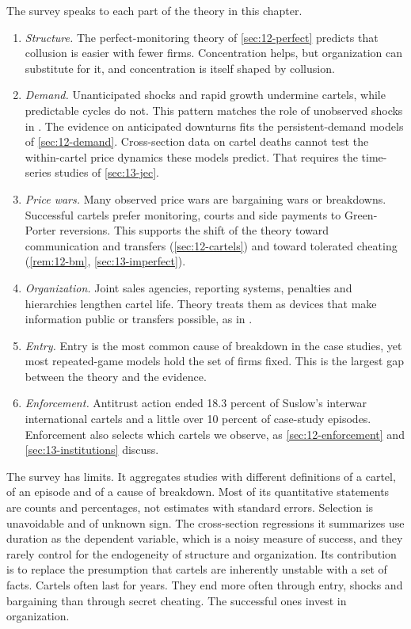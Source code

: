 The survey speaks to each part of the theory in this chapter.
\begin{enumerate}[label=(\arabic*)]
\item \emph{Structure.} The perfect-monitoring theory of \cref{sec:12-perfect} predicts that collusion is easier with
fewer firms. Concentration helps, but organization can substitute for it, and concentration is itself shaped by
collusion.
\item \emph{Demand.} Unanticipated shocks and rapid growth undermine cartels, while predictable cycles do not. This
pattern matches the role of unobserved shocks in \citet{GreenPorter1984}. The evidence on anticipated downturns fits
the persistent-demand models of \cref{sec:12-demand}. Cross-section data on cartel deaths cannot test the
within-cartel price dynamics these models predict. That requires the time-series studies of \cref{sec:13-jec}.
\item \emph{Price wars.} Many observed price wars are bargaining wars or breakdowns. Successful cartels prefer
monitoring, courts and side payments to Green-Porter reversions. This supports the shift of the theory toward
communication and transfers (\cref{sec:12-cartels}) and toward tolerated cheating (\cref{rem:12-bm},
\cref{sec:13-imperfect}).
\item \emph{Organization.} Joint sales agencies, reporting systems, penalties and hierarchies lengthen cartel life.
Theory treats them as devices that make information public or transfers possible, as in
\citet{HarringtonSkrzypacz2011}.
\item \emph{Entry.} Entry is the most common cause of breakdown in the case studies, yet most repeated-game models
hold the set of firms fixed. This is the largest gap between the theory and the evidence.
\item \emph{Enforcement.} Antitrust action ended 18.3 percent of Suslow's interwar international cartels and a little
over 10 percent of case-study episodes. Enforcement also selects which cartels we observe, as \cref{sec:12-enforcement}
and \cref{sec:13-institutions} discuss.
\end{enumerate}

The survey has limits. It aggregates studies with different definitions of a cartel, of an episode and of a cause of
breakdown. Most of its quantitative statements are counts and percentages, not estimates with standard errors. Selection
is unavoidable and of unknown sign. The cross-section regressions it summarizes use duration as the dependent variable,
which is a noisy measure of success, and they rarely control for the endogeneity of structure and organization. Its
contribution is to replace the presumption that cartels are inherently unstable with a set of facts. Cartels often
last for years. They end more often through entry, shocks and bargaining than through secret cheating. The successful
ones invest in organization.

